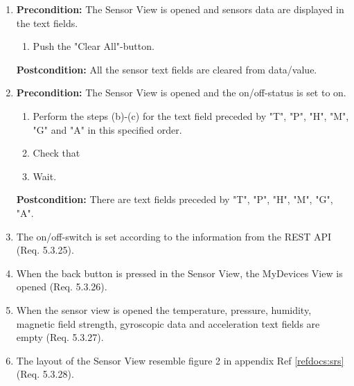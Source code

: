 \documentclass[a4paper]{article}
\newlength{\testlabellength}
\newenvironment{testlist}{\begin{enumerate}[label=\bfseries Instruction \thesubsection.\arabic* , labelindent=0pt, labelwidth=\testlabellength , leftmargin=2cm]}{\end{enumerate}}
\begin{document}
\begin{appendices}
\begin{testlist}
 \item \vspace{5mm} \textbf{Precondition:} The Sensor View is opened and sensors data are displayed in the text fields.
    			\begin{enumerate}
    				\item Push the "Clear All"-button.
    			
    			\end{enumerate}
    			\textbf{Postcondition:} All the sensor text fields are cleared from data/value.

 \item \vspace{5mm} \textbf{Precondition:} The Sensor View is opened and the on/off-status is set to on. 
    			\begin{enumerate}
    				\item Perform the steps (b)-(c) for the text field preceded by "T", "P", "H", "M", "G" and "A" in this specified order.
    				\item Check that 
	    			\item Wait.
    			
    			\end{enumerate}
    			\textbf{Postcondition:} There are text fields preceded by "T", "P", "H", "M", "G", "A".

\item The on/off-switch is set according to the information from the REST API (Req. 5.3.25).

\item When the back button is pressed in the Sensor View, the MyDevices View is opened (Req. 5.3.26).

\item When the sensor view is opened the temperature, pressure, humidity, magnetic field strength, gyroscopic data and acceleration text fields are empty (Req. 5.3.27).

\item The layout of the Sensor View resemble figure 2 in appendix  Ref \ref{refdocs:srs} (Req. 5.3.28).


\end{testlist}
\end{appendices}
\end{document}
